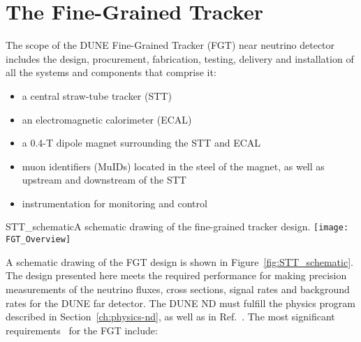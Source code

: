 \section{The Fine-Grained Tracker} 
\label{cdrsec:detectors-nd-ref}

The scope of the DUNE Fine-Grained Tracker (FGT) near neutrino detector includes the design, procurement, fabrication, testing, delivery and installation of all the systems and components that comprise it:


\begin{itemize}
\item a central straw-tube tracker (STT)
\item an electromagnetic calorimeter (ECAL) 
\item a 0.4-T dipole magnet surrounding the STT and ECAL
\item muon identifiers (MuIDs) located in the steel of the magnet, as well as upstream and downstream of the STT
\item instrumentation for monitoring and control
\end{itemize}



\begin{cdrfigure}{STT_schematic}{A schematic drawing of the fine-grained tracker design.}
\texttt{[image: FGT\_Overview]}
\end{cdrfigure}

A schematic drawing of the FGT design is shown in Figure~\ref{fig:STT_schematic}. 
The design presented here meets the required performance for making precision measurements of the 
neutrino fluxes, cross sections, signal rates and background rates for the DUNE far detector. 
The DUNE ND must fulfill the physics program described in Section~\ref{ch:physics-nd}, as well 
as in Ref.~\cite{DPR}. The most significant requirements~\cite{ND-REQ1,ND-REQ2} for the FGT include:  

